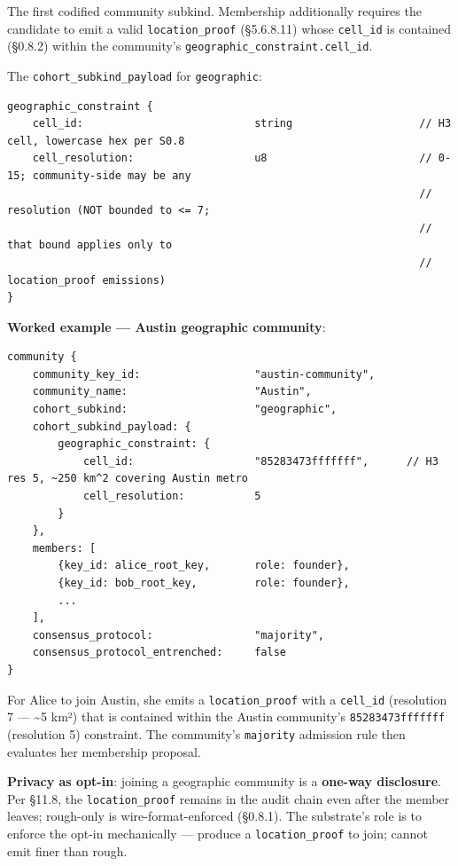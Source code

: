 \documentclass[11pt]{article}
\begin{document}
The first codified community subkind. Membership additionally requires the candidate to emit a valid \texttt{location\_proof} (§5.6.8.11) whose \texttt{cell\_id} is contained (§0.8.2) within the community's \texttt{geographic\_constraint.cell\_id}.


The \texttt{cohort\_subkind\_payload} for \texttt{geographic}:


\begin{lstlisting}
geographic_constraint {
    cell_id:                           string                    // H3 cell, lowercase hex per S0.8
    cell_resolution:                   u8                        // 0-15; community-side may be any
                                                                 //   resolution (NOT bounded to <= 7;
                                                                 //   that bound applies only to
                                                                 //   location_proof emissions)
}
\end{lstlisting}

\textbf{Worked example — Austin geographic community}:


\begin{lstlisting}
community {
    community_key_id:                  "austin-community",
    community_name:                    "Austin",
    cohort_subkind:                    "geographic",
    cohort_subkind_payload: {
        geographic_constraint: {
            cell_id:                   "85283473fffffff",      // H3 res 5, ~250 km^2 covering Austin metro
            cell_resolution:           5
        }
    },
    members: [
        {key_id: alice_root_key,       role: founder},
        {key_id: bob_root_key,         role: founder},
        ...
    ],
    consensus_protocol:                "majority",
    consensus_protocol_entrenched:     false
}
\end{lstlisting}

For Alice to join Austin, she emits a \texttt{location\_proof} with a \texttt{cell\_id} (resolution 7 — \textasciitilde{}5 km²) that is contained within the Austin community's \texttt{85283473fffffff} (resolution 5) constraint. The community's \texttt{majority} admission rule then evaluates her membership proposal.


\textbf{Privacy as opt-in}: joining a geographic community is a \textbf{one-way disclosure}. Per §11.8, the \texttt{location\_proof} remains in the audit chain even after the member leaves; rough-only is wire-format-enforced (§0.8.1). The substrate's role is to enforce the opt-in mechanically — produce a \texttt{location\_proof} to join; cannot emit finer than rough.
\end{document}
